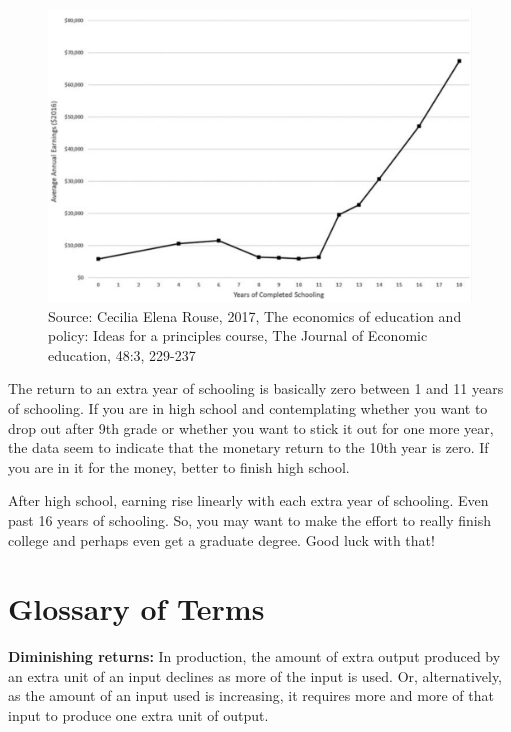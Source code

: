 \documentclass[
]{book}
\begin{document}
\begin{figure}

{\centering \includegraphics[width=1\linewidth]{img/ch2/fig11} 

}

\caption{Source: Cecilia Elena Rouse, 2017, The economics of education and policy: Ideas for a principles course, The Journal of Economic education, 48:3, 229-237}\label{fig:fig211}
\end{figure}

The return to an extra year of schooling is basically zero between 1 and 11 years of schooling. If you are in high school and contemplating whether you want to drop out after 9th grade or whether you want to stick it out for one more year, the data seem to indicate that the monetary return to the 10th year is zero. If you are in it for the money, better to finish high school.

After high school, earning rise linearly with each extra year of schooling. Even past 16 years of schooling. So, you may want to make the effort to really finish college and perhaps even get a graduate degree. Good luck with that!

\hypertarget{glossary-of-terms-2}{%
\section{Glossary of Terms}\label{glossary-of-terms-2}}

\textbf{Diminishing returns:} In production, the amount of extra output produced by an extra unit of an input declines as more of the input is used. Or, alternatively, as the amount of an input used is increasing, it requires more and more of that input to produce one extra unit of output.
\end{document}
